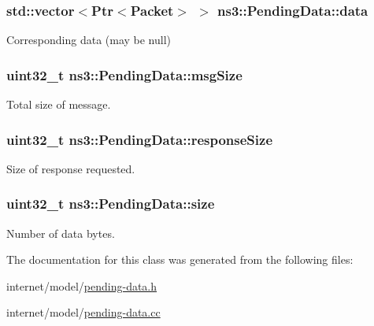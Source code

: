 \subsubsection[{\texorpdfstring{data}{data}}]{\setlength{\rightskip}{0pt plus 5cm}std\+::vector$<${\bf Ptr}$<${\bf Packet}$>$ $>$ ns3\+::\+Pending\+Data\+::data}\hypertarget{classns3_1_1PendingData_ab6ccbe1d5ca0d4536e4ad454971eb460}{}\label{classns3_1_1PendingData_ab6ccbe1d5ca0d4536e4ad454971eb460}


Corresponding data (may be null) 

\subsubsection[{\texorpdfstring{msg\+Size}{msgSize}}]{\setlength{\rightskip}{0pt plus 5cm}uint32\+\_\+t ns3\+::\+Pending\+Data\+::msg\+Size}\hypertarget{classns3_1_1PendingData_a2a75f456906faa288dd2ca409042173e}{}\label{classns3_1_1PendingData_a2a75f456906faa288dd2ca409042173e}


Total size of message. 

\subsubsection[{\texorpdfstring{response\+Size}{responseSize}}]{\setlength{\rightskip}{0pt plus 5cm}uint32\+\_\+t ns3\+::\+Pending\+Data\+::response\+Size}\hypertarget{classns3_1_1PendingData_a279ab96448f59ee2845c75e34cfad717}{}\label{classns3_1_1PendingData_a279ab96448f59ee2845c75e34cfad717}


Size of response requested. 

\subsubsection[{\texorpdfstring{size}{size}}]{\setlength{\rightskip}{0pt plus 5cm}uint32\+\_\+t ns3\+::\+Pending\+Data\+::size}\hypertarget{classns3_1_1PendingData_a7ab8727ea8af4328619add818c858208}{}\label{classns3_1_1PendingData_a7ab8727ea8af4328619add818c858208}


Number of data bytes. 



The documentation for this class was generated from the following files\+:\begin{DoxyCompactItemize}
\item 
internet/model/\hyperlink{pending-data_8h}{pending-\/data.\+h}\item 
internet/model/\hyperlink{pending-data_8cc}{pending-\/data.\+cc}\end{DoxyCompactItemize}
